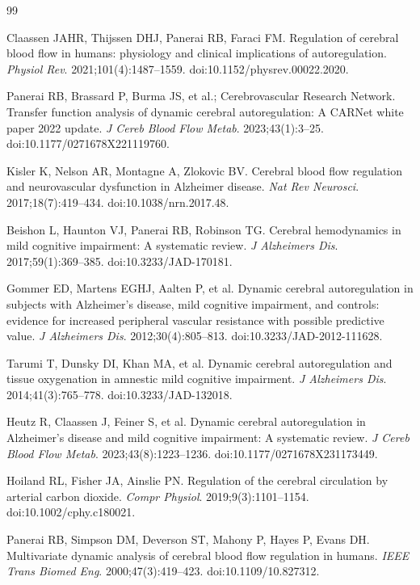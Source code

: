 \documentclass[12pt]{article}
\begin{document}
\begin{thebibliography}{99}

Claassen JAHR, Thijssen DHJ, Panerai RB, Faraci FM.
Regulation of cerebral blood flow in humans: physiology and clinical
implications of autoregulation.
\textit{Physiol Rev}. 2021;101(4):1487--1559.
doi:10.1152/physrev.00022.2020.

Panerai RB, Brassard P, Burma JS, et al.; Cerebrovascular Research Network.
Transfer function analysis of dynamic cerebral autoregulation: A CARNet white
paper 2022 update.
\textit{J Cereb Blood Flow Metab}. 2023;43(1):3--25.
doi:10.1177/0271678X221119760.

Kisler K, Nelson AR, Montagne A, Zlokovic BV.
Cerebral blood flow regulation and neurovascular dysfunction in Alzheimer
disease.
\textit{Nat Rev Neurosci}. 2017;18(7):419--434.
doi:10.1038/nrn.2017.48.

Beishon L, Haunton VJ, Panerai RB, Robinson TG.
Cerebral hemodynamics in mild cognitive impairment: A systematic review.
\textit{J Alzheimers Dis}. 2017;59(1):369--385.
doi:10.3233/JAD-170181.

Gommer ED, Martens EGHJ, Aalten P, et al.
Dynamic cerebral autoregulation in subjects with Alzheimer's disease, mild
cognitive impairment, and controls: evidence for increased peripheral
vascular resistance with possible predictive value.
\textit{J Alzheimers Dis}. 2012;30(4):805--813.
doi:10.3233/JAD-2012-111628.

Tarumi T, Dunsky DI, Khan MA, et al.
Dynamic cerebral autoregulation and tissue oxygenation in amnestic mild
cognitive impairment.
\textit{J Alzheimers Dis}. 2014;41(3):765--778.
doi:10.3233/JAD-132018.

Heutz R, Claassen J, Feiner S, et al.
Dynamic cerebral autoregulation in Alzheimer's disease and mild cognitive
impairment: A systematic review.
\textit{J Cereb Blood Flow Metab}. 2023;43(8):1223--1236.
doi:10.1177/0271678X231173449.

Hoiland RL, Fisher JA, Ainslie PN.
Regulation of the cerebral circulation by arterial carbon dioxide.
\textit{Compr Physiol}. 2019;9(3):1101--1154.
doi:10.1002/cphy.c180021.

Panerai RB, Simpson DM, Deverson ST, Mahony P, Hayes P, Evans DH.
Multivariate dynamic analysis of cerebral blood flow regulation in humans.
\textit{IEEE Trans Biomed Eng}. 2000;47(3):419--423.
doi:10.1109/10.827312.


\end{thebibliography}
\end{document}
